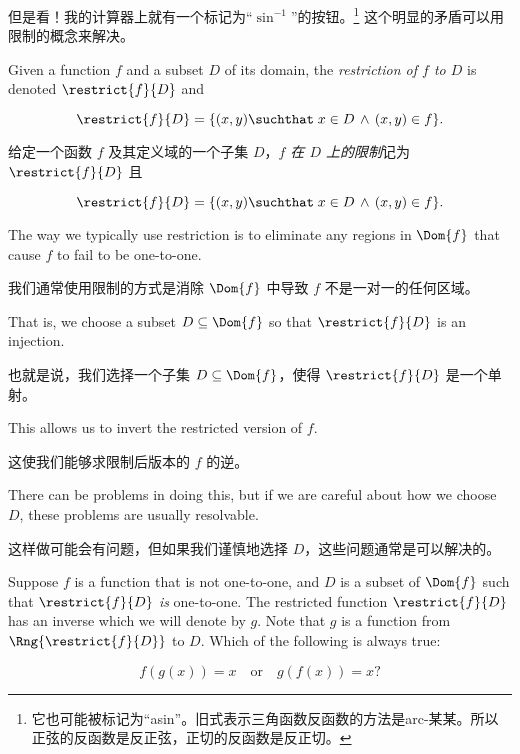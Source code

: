 但是看！我的计算器上就有一个标记为“$\sin^{-1}$”的按钮。\footnote{它也可能被标记为“asin”。旧式表示三角函数反函数的方法是arc-某某。所以正弦的反函数是反正弦，正切的反函数是反正切。} 这个明显的矛盾可以用限制的概念来解决。

\begin{defi}
Given a function $f$ and a subset $D$ of its domain, the
\emph{restriction of $f$ to $D$} is denoted $\restrict{f}{D}$ and

\[ \restrict{f}{D} = \{ (x,y) \suchthat \; x \in D \, \land \, (x,y) \in f \}. \]
\end{defi}

\begin{defi}
给定一个函数 $f$ 及其定义域的一个子集 $D$，\emph{$f$ 在 $D$ 上的限制}记为 $\restrict{f}{D}$ 且

\[ \restrict{f}{D} = \{ (x,y) \suchthat \; x \in D \, \land \, (x,y) \in f \}. \]
\end{defi}

The way we typically use restriction is to eliminate any regions in
$\Dom{f}$ that cause $f$ to fail to be one-to-one.

我们通常使用限制的方式是消除 $\Dom{f}$ 中导致 $f$ 不是一对一的任何区域。

That is, we
choose a subset $D \subseteq \Dom{f}$ so that $\restrict{f}{D}$ is an injection.

也就是说，我们选择一个子集 $D \subseteq \Dom{f}$，使得 $\restrict{f}{D}$ 是一个单射。

This allows us to invert the restricted version of $f$.

这使我们能够求限制后版本的 $f$ 的逆。

There can be
problems in doing this, but if we are careful about how we choose $D$,
these problems are usually resolvable.

这样做可能会有问题，但如果我们谨慎地选择 $D$，这些问题通常是可以解决的。

\begin{exer}
Suppose $f$ is a function that is not one-to-one, and $D$ is a subset
of $\Dom{f}$ such that $\restrict{f}{D}$ \emph{is} one-to-one. The restricted
function $\restrict{f}{D}$ has an inverse which we will denote by $g$. Note that $g$ is a function from $\Rng{\restrict{f}{D}}$ to $D$. Which
of the following is always true:

\[ f(g(x)) = x \quad \mbox{or} \quad g(f(x)) = x ? \]
\end{exer}


